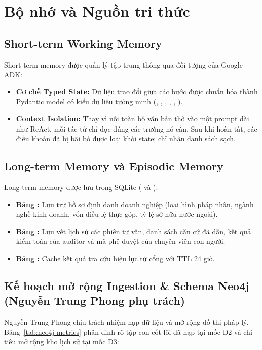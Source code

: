\documentclass[10pt,a4paper]{article}
\begin{document}
\section{Bộ nhớ và Nguồn tri thức}

\subsection{Short-term Working Memory}
Short-term memory được quản lý tập trung thông qua đối tượng  của Google ADK:
\begin{itemize}
  \item \textbf{Cơ chế Typed State:} Dữ liệu trao đổi giữa các bước được chuẩn hóa thành Pydantic model có kiểu dữ liệu tường minh (, , , , , ).
  \item \textbf{Context Isolation:} Thay vì nối toàn bộ văn bản thô vào một prompt dài như ReAct, mỗi tác tử chỉ đọc đúng các trường nó cần. Sau khi  hoàn tất, các điều khoản đã bị bãi bỏ được loại khỏi state;  chỉ nhận danh sách  sạch.
\end{itemize}

\subsection{Long-term Memory và Episodic Memory}
Long-term memory được lưu trong SQLite ( và ):
\begin{itemize}
  \item \textbf{Bảng :} Lưu trữ hồ sơ định danh doanh nghiệp (loại hình pháp nhân, ngành nghề kinh doanh, vốn điều lệ thực góp, tỷ lệ sở hữu nước ngoài).
  \item \textbf{Bảng :} Lưu vết lịch sử các phiên tư vấn, danh sách căn cứ đã dẫn, kết quả kiểm toán của auditor và mã phê duyệt của chuyên viên con người.
  \item \textbf{Bảng :} Cache kết quả tra cứu hiệu lực từ cổng  với TTL 24 giờ.
\end{itemize}

\subsection{Kế hoạch mở rộng Ingestion \& Schema Neo4j (Nguyễn Trung Phong phụ trách)}
Nguyễn Trung Phong chịu trách nhiệm nạp dữ liệu và mở rộng đồ thị pháp lý. Bảng~\ref{tab:neo4j-metrics} phân định rõ tập con cốt lõi đã nạp tại mốc D2 và chỉ tiêu mở rộng kho lịch sử tại mốc D3:
\end{document}
